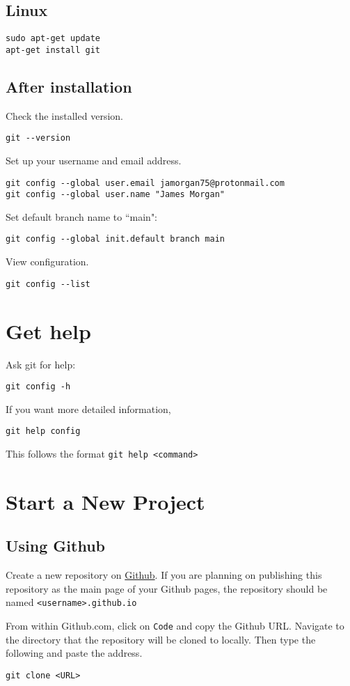 \documentclass[12pt]{article}
\begin{document}
\subsection*{Linux}
\begin{Verbatim}
sudo apt-get update
apt-get install git
\end{Verbatim}
\subsection*{After installation}
Check the installed version.
\begin{Verbatim}
git --version
\end{Verbatim}
Set up your username and email address.
\begin{Verbatim}
git config --global user.email jamorgan75@protonmail.com
git config --global user.name "James Morgan"
\end{Verbatim}
Set default branch name to ``main":
\begin{Verbatim}
git config --global init.default branch main
\end{Verbatim}
View configuration.
\begin{Verbatim}
git config --list
\end{Verbatim}


\newpage


\section{Get help}
Ask git for help:
\begin{Verbatim}
git config -h
\end{Verbatim}
If you want more detailed information,
\begin{Verbatim}
git help config
\end{Verbatim}
This follows the format \verb|git help <command>|





\section{Start a New Project}
\subsection*{Using Github}
Create a new repository on \href{https://github.com/}{Github}. If you are planning on publishing this repository as the main page of your Github pages, the repository should be named\; \verb|<username>.github.io|\par
From within Github.com, click on \verb|Code| and copy the Github URL. Navigate to the directory that the repository will be cloned to locally. Then type the following and paste the address.
\begin{Verbatim}
git clone <URL>
\end{Verbatim}
\end{document}
